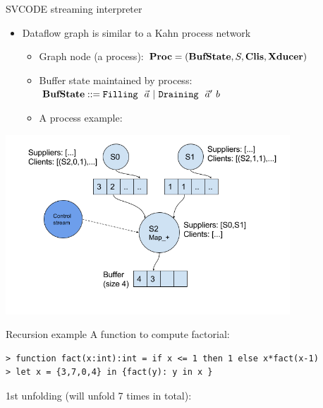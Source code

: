 \documentclass{beamer}
\begin{document}
\begin{frame}{SVCODE streaming interpreter}
	\begin{itemize}
	\item Dataflow graph is similar to a Kahn process network
	\begin{itemize}
		\item Graph node (a process): $\mathbf{Proc}   =  (\mathbf{BufState}, S, \mathbf{Clis}, \mathbf{Xducer})$
		\item Buffer state maintained by process: $\bufst ::= \filling \ \a  \ | \ \draining \ \a' \ b$ 
		\item A process example: 
	\end{itemize}

	\end{itemize}
	\includegraphics[width=0.8\textwidth]{../fig/process}
\end{frame}


\begin{frame}[fragile]{Recursion example}
A function to compute factorial:
\begin{lstlisting}[style=nesl-style]
> function fact(x:int):int = if x <= 1 then 1 else x*fact(x-1)
> let x = {3,7,0,4} in {fact(y): y in x }
\end{lstlisting}

1st unfolding (will unfold 7 times in total):
	
    
\end{frame}


\def\fmsnesl{SNESL\textsubscript{0}}
\def\fmsvcode{SVCODE\textsubscript{0}}

\def\seval#1#2#3#4#5{\left\langle#1,#2 \right\rangle \Da^{#3} #4 \ \$ \ #5} 
\def\sevalf#1#2#3#4{{\lcall}(#1,...,#2) \Da^{#3} #4}
\def\sevalfg#1#2#3#4{#1(#2) \Da^{#3} #4}
\def\Eval#1#2#3#4{#1 \Env #2 \Eva #3 \ \$ \ #4 } 
\def\Type#1#2#3{#1 \Env #2 : #3 } 
\def\Typef#1#2#3{#1 : (#2) \rightarrow #3}
\def\TypeV#1#2{#1 : #2}
\def\ValRep#1#2#3{ #1 \mathrel{\triangleright_{#2}} #3}
\newcommand{\blocke}[3]{\lcall(#1,...,#2) \Eva #3}
\end{document}
